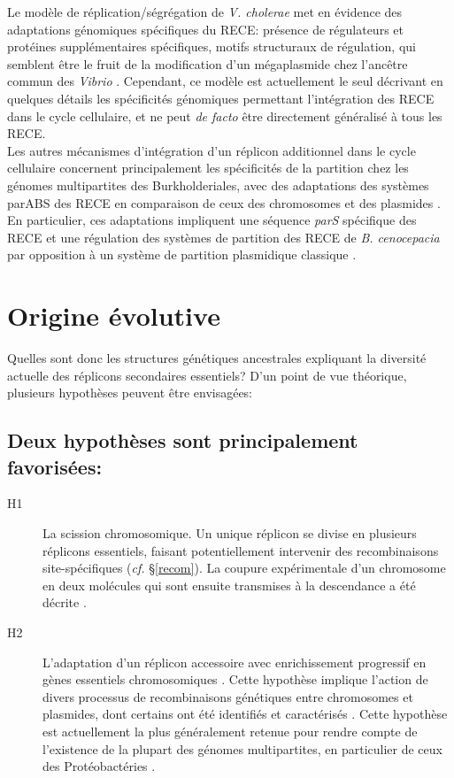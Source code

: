 	 Le modèle de réplication/ségrégation de \textit{V. cholerae} met en évidence des adaptations génomiques spécifiques du RECE: présence de régulateurs et protéines supplémentaires spécifiques, motifs structuraux de régulation, qui semblent être le fruit de la modification d'un mégaplasmide chez l'ancêtre commun des \textit{Vibrio} \citep{Heidelberg2000}. Cependant, ce modèle est actuellement le seul décrivant en quelques détails les spécificités génomiques permettant l'intégration des RECE dans le cycle cellulaire, et ne peut \textit{de facto} être directement généralisé à tous les RECE.\\
	Les autres mécanismes d'intégration d'un réplicon additionnel dans le cycle cellulaire concernent principalement les spécificités de la partition chez les génomes multipartites des Burkholderiales, avec des adaptations des systèmes parABS des RECE en comparaison de ceux des chromosomes et des plasmides \citep{Dubarry2006a,Livny2007,Passot2012}. En particulier, ces adaptations impliquent une séquence \textit{parS} spécifique des RECE et une régulation des systèmes de partition des RECE de \textit{B. cenocepacia} par opposition à un système de partition plasmidique classique \citep{Dubarry2006a}.


\section{Origine évolutive}\label{chrIIori}
	Quelles sont donc les structures génétiques ancestrales expliquant la diversité actuelle des réplicons secondaires essentiels? D'un point de vue théorique, plusieurs hypothèses peuvent être envisagées:
	
\subsection*{Deux hypothèses sont principalement favorisées:}
\begin{description}
	 \item[H1] La scission chromosomique. Un unique réplicon se divise en plusieurs réplicons essentiels, faisant potentiellement intervenir des recombinaisons site-spécifiques (\textit{cf.} \S \ref{recom}). La coupure expérimentale d'un chromosome en deux molécules qui sont ensuite  transmises à la descendance a été décrite  \citep{guo2003natural,itaya1997experimental}. 
	 \item[H2]  L'adaptation d'un réplicon accessoire avec enrichissement progressif en gènes essentiels chromosomiques  \citep{Moreno1998,Mackenzie2004}. Cette hypothèse implique l'action de divers processus de recombinaisons génétiques entre chromosomes et plasmides, dont certains ont été identifiés et caractérisés \citep{Slater2009,Guo2010,maida2014origin}. Cette hypothèse est actuellement la plus généralement retenue pour rendre compte de l'existence de la plupart des génomes multipartites, en particulier de ceux des Protéobactéries \citep{Bavishi2010}. 
\end{description}
